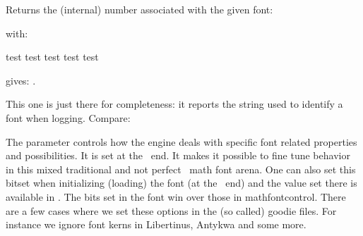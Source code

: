 \stopoldprimitive

\startnewprimitive[title={\prm {fontid}}]

Returns the (internal) number associated with the given font:

\startbuffer
{\bf \xdef\MyFontA{\the\fontid\font}}
{\sl \xdef\MyFontB{\setfontid\the\fontid\font}}
\stopbuffer

\typebuffer \getbuffer

with:

\startbuffer
test {\setfontid\MyFontA test} test {\MyFontB test} test
\stopbuffer

\typebuffer

gives: \inlinebuffer.

\stopnewprimitive

\startnewprimitive[title={\prm {fontidentifier}}]

This one is just there for completeness: it reports the string used to identify a
font when logging. Compare:

\starttabulate
\NC \type {\fontname      \font} \NC \fontname      \font \NC \NR
\NC \type {\fontidentifier\font} \NC \fontidentifier\font \NC \NR
\NC \type {\the\fontid    \font} \NC \the\fontid    \font \NC \NR
\stoptabulate

\stopnewprimitive

\startnewprimitive[title={\prm {fontmathcontrol}}]

The  parameter controls how the engine deals with specific
font related properties and possibilities. It is set at the \TEX\ end. It makes
it possible to fine tune behavior in this mixed traditional and not perfect
\OPENTYPE\ math font arena. One can also set this bitset when initializing
(loading) the font (at the \LUA\ end) and the value set there is available in
. The bits set in the font win over those in \prm
{mathfontcontrol}. There are a few cases where we set these options in the (so
called) goodie files. For instance we ignore font kerns in Libertinus, Antykwa
and some more.


